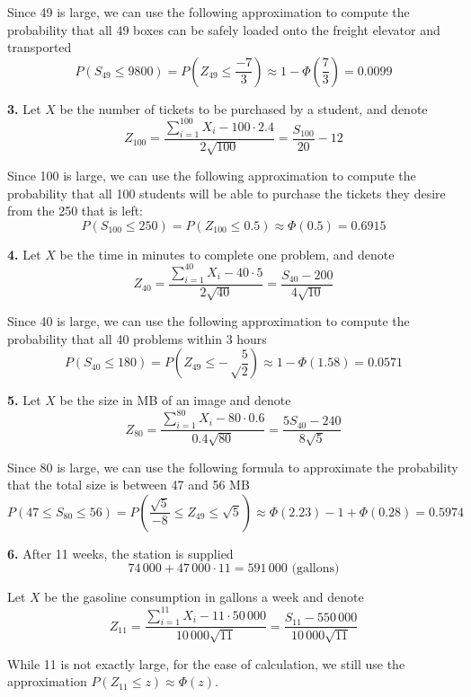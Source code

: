 \documentclass[a4paper,12pt]{article}
\newcommand{\exercise}[1]{\noindent\textbf{#1.}}
\begin{document}
Since 49 is large, we can use the following approximation
to compute the probability that all 49 boxes can be
safely loaded onto the freight elevator and transported
\[P(S_{49} \le 9800) = P\left(Z_{49} \le \frac{-7}{3}\right)
\approx 1 - \Phi\left(\frac 7 3\right) = 0.0099\]

\exercise 3  Let $X$ be the number of tickets to be purchased by a student,
and denote
\[Z_{100} = \frac{\sum_{i=1}^{100}X_i - 100\cdot 2.4}{2\sqrt{100}}
= \frac{S_{100}}{20} - 12\]

Since 100 is large, we can use the following approximation
to compute the probability that all 100 students will be able to purchase
the tickets they desire from the 250 that is left:
\[P(S_{100} \le 250) = P(Z_{100} \le 0.5)
\approx \Phi(0.5) = 0.6915\]

\exercise 4  Let $X$ be the time in minutes to complete one problem,
and denote
\[Z_{40} = \frac{\sum_{i=1}^{40}X_i - 40\cdot 5}{2\sqrt{40}}
= \frac{S_{40} - 200}{4\sqrt{10}}\]

Since 40 is large, we can use the following approximation
to compute the probability that all 40 problems within 3 hours
\[P(S_{40} \le 180) = P\left(Z_{49} \le -\sqrt\frac{5}{2}\right)
\approx 1 - \Phi(1.58) = 0.0571\]

\exercise 5  Let $X$ be the size in MB of an image and denote
\[Z_{80} = \frac{\sum_{i=1}^{80}X_i - 80\cdot 0.6}{0.4\sqrt{80}}
= \frac{5S_{40} - 240}{8\sqrt{5}}\]

Since 80 is large, we can use the following formula to approximate
the probability that the total size is between 47 and 56 MB
\[P(47 \le S_{80} \le 56)
= P\left(\frac{\sqrt 5}{-8} \le Z_{49} \le \sqrt 5\right)
\approx \Phi(2.23) - 1 + \Phi(0.28) = 0.5974\]

\exercise 6  After 11 weeks, the station is supplied
\[74\,000 + 47\,000 \cdot 11 = 591\,000\text{ (gallons)}\]

Let $X$ be the gasoline consumption in gallons a week and denote
\[Z_{11} = \frac{\sum_{i=1}^{11}X_i - 11\cdot 50\,000}{10\,000\sqrt{11}}
= \frac{S_{11} - 550\,000}{10\,000\sqrt{11}}\]

While 11 is not exactly large, for the ease of calculation,
we still use the approximation $P(Z_{11} \le z) \approx \Phi(z)$.
\end{document}
